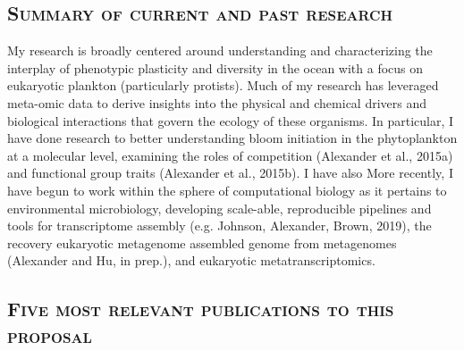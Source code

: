 \documentclass[svgnames,11pt]{article}
\begin{document}
\subsection*{\textsc{Summary of current and past research}}
My research is broadly centered around understanding and characterizing the interplay of phenotypic plasticity and diversity in the ocean with a focus on eukaryotic plankton (particularly protists). Much of my research has leveraged meta-omic data to derive insights into the physical and chemical drivers and biological interactions that govern the ecology of these organisms. In particular, I have done research to better understanding bloom initiation in the phytoplankton at a molecular level, examining the roles of competition (Alexander et al., 2015a) and functional group traits (Alexander et al., 2015b). I have also More recently, I have begun to work within the sphere of computational biology as it pertains to environmental microbiology, developing scale-able, reproducible pipelines and tools for transcriptome assembly (e.g. Johnson, Alexander, Brown, 2019), the recovery eukaryotic metagenome assembled genome from metagenomes (Alexander and Hu, in prep.), and eukaryotic metatranscriptomics.



\subsection*{\textsc{Five most relevant publications to this proposal}}
\vspace*{-0.75cm}

\end{document}

